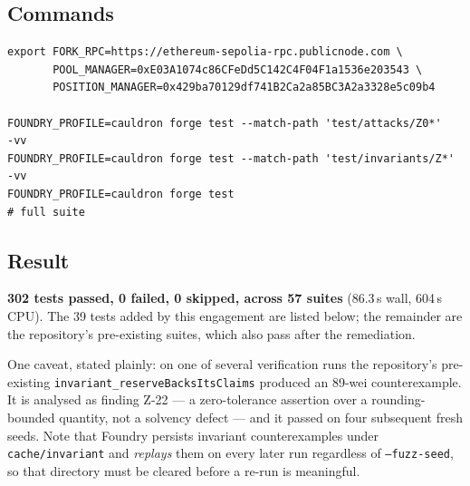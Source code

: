 \documentclass[10pt,a4paper]{article}
\newcommand{\code}[1]{\texttt{\small #1}}
\begin{document}
\subsection{Commands}
\begin{lstlisting}
export FORK_RPC=https://ethereum-sepolia-rpc.publicnode.com \
       POOL_MANAGER=0xE03A1074c86CFeDd5C142C4F04F1a1536e203543 \
       POSITION_MANAGER=0x429ba70129df741B2Ca2a85BC3A2a3328e5c09b4

FOUNDRY_PROFILE=cauldron forge test --match-path 'test/attacks/Z0*'   -vv
FOUNDRY_PROFILE=cauldron forge test --match-path 'test/invariants/Z*' -vv
FOUNDRY_PROFILE=cauldron forge test                                        # full suite
\end{lstlisting}

\subsection{Result}
\textbf{302 tests passed, 0 failed, 0 skipped, across 57 suites} (86.3\,s wall,
604\,s CPU). The 39 tests added by this engagement are listed below; the remainder are the
repository's pre-existing suites, which also pass after the remediation.

One caveat, stated plainly: on one of several verification runs the repository's
pre-existing \code{invariant\_reserveBacksItsClaims} produced an 89-wei counterexample.
It is analysed as finding Z-22 --- a zero-tolerance assertion over a rounding-bounded
quantity, not a solvency defect --- and it passed on four subsequent fresh seeds. Note that
Foundry persists invariant counterexamples under \code{cache/invariant} and \emph{replays}
them on every later run regardless of \code{--fuzz-seed}, so that directory must be cleared
before a re-run is meaningful.
\end{document}
